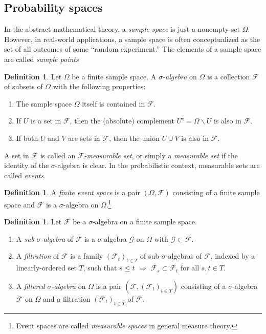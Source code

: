 \documentclass[reqno]{amsart}
\theoremstyle{definition}
\newtheorem{defn}[thm]{Definition}
\numberwithin{equation}{section}
\begin{document}
\subsection{Probability spaces}

In the abstract mathematical theory, a \textit{sample space} is just a nonempty set $\Omega$. However, in real-world applications, a sample space is often conceptualized as the set of all outcomes of some ``random experiment.'' The elements of a sample space are called \textit{sample points}

\begin{defn}
Let $\Omega$ be a finite sample space. A \textit{$\sigma$-algebra} on $\Omega$ is a collection $\mathcal{F}$ of subsets of $\Omega$ with the following properties:
\begin{enumerate}
\item The sample space $\Omega$ itself is contained in $\mathcal{F}$.
\item If $U$ is a set in $\mathcal{F}$, then the (absolute) complement $U^c = \Omega \smallsetminus U$ is also in $\mathcal{F}$.
\item If both $U$ and $V$ are sets in $\mathcal{F}$, then the union $U\cup V$ is also in $\mathcal{F}$.
\end{enumerate}
A set in $\mathcal{F}$ is called an \textit{$\mathcal{F}$-measurable set}, or simply a \textit{measurable set} if the identity of the $\sigma$-algebra is clear. In the probabilistic context, measurable sets are called \textit{events}.
\end{defn}

\begin{defn}
A \textit{finite event space} is a pair $(\Omega, \mathcal{F})$ consisting of a finite sample space and $\mathcal{F}$ is a $\sigma$-algebra on $\Omega$.\footnote{Event spaces are called \textit{measurable spaces} in general measure theory.}
\end{defn}

\begin{defn}
Let $\mathcal{F}$ be a $\sigma$-algebra on a finite sample space.
\begin{enumerate}
\item A \textit{sub-$\sigma$-algebra} of $\mathcal{F}$ is a $\sigma$-algebra $\mathcal{G}$ on $\Omega$ with $\mathcal{G} \subset \mathcal{F}$.
\item A \textit{filtration} of $\mathcal{F}$ is a family $(\mathcal{F}_t)_{t\in T}$ of sub-$\sigma$-algebras of $\mathcal{F}$, indexed by a linearly-ordered set $T$, such that $s \leq t$ $\Rightarrow$ $\mathcal{F}_s \subset \mathcal{F}_t$ for all $s,t\in T$.
\item A \textit{filtered $\sigma$-algebra} on $\Omega$ is a pair $(\mathcal{F}, (\mathcal{F}_t)_{t\in T})$ consisting of a $\sigma$-algebra $\mathcal{F}$ on $\Omega$ and a filtration $(\mathcal{F}_t)_{t\in T}$ of $\mathcal{F}$.
\end{enumerate}
\end{defn}
\end{document}
